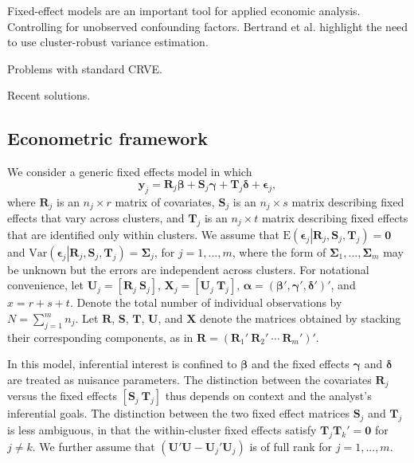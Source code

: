 \documentclass[12pt]{article}\usepackage[]{graphicx}\usepackage[]{color}
\newcommand{\E}{\text{E}}
\newcommand{\Var}{\text{Var}}
\newcommand{\bm}{\mathbf}
\newcommand{\bs}{\boldsymbol}
\begin{document}
Fixed-effect models are an important tool for applied economic analysis. 
Controlling for unobserved confounding factors.
Bertrand et al. highlight the need to use cluster-robust variance estimation.

Problems with standard CRVE.

Recent solutions. 

\subsection{Econometric framework}

We consider a generic fixed effects model in which
\begin{equation}
\label{eq:fixed_effects}
\bm{y}_j = \bm{R}_j \bs\beta + \bm{S}_j \bs\gamma + \bm{T}_j \bs\delta + \bs\epsilon_j,
\end{equation}
where $\bm{R}_j$ is an $n_j \times r$ matrix of covariates, $\bm{S}_j$ is an $n_j \times s$ matrix describing fixed effects that vary across clusters, and $\bm{T}_j$ is an $n_j \times t$ matrix describing fixed effects that are identified only within clusters. 
We assume that $\E\left(\bs\epsilon_j\left|\bm{R}_j,\bm{S}_j, \bm{T}_j\right.\right) = \bm{0}$ and $\Var\left(\bs\epsilon_j\left|\bm{R}_j,\bm{S}_j,\bm{T}_j\right.\right) = \bs\Sigma_j$, for $j = 1,...,m$, where the form of $\bs\Sigma_1,...,\bs\Sigma_m$ may be unknown but the errors are independent across clusters. 
For notational convenience, let $\bm{U}_j = \left[\bm{R}_j \ \bm{S}_j \right]$, $\bm{X}_j = \left[\bm{U}_j \ \bm{T}_j \right]$, $\bs\alpha = \left(\bs\beta', \bs\gamma', \bs\delta' \right)'$, and $x = r + s + t$.
Denote the total number of individual observations by $N = \sum_{j=1}^m n_j$.
Let $\bm{R}$, $\bm{S}$, $\bm{T}$, $\bm{U}$, and $\bm{X}$ denote the matrices obtained by stacking their corresponding components, as in $\bm{R} = \left(\bm{R}_1' \ \bm{R}_2' \ \cdots \ \bm{R}_m'\right)'$. 

In this model, inferential interest is confined to $\bs\beta$ and the fixed effects $\bs\gamma$ and $\bs\delta$ are treated as nuisance parameters. The distinction between the covariates $\bm{R}_j$ versus the fixed effects $\left[\bm{S}_j \ \bm{T}_j\right]$ thus depends on context and the analyst's inferential goals. The distinction between the two fixed effect matrices $\bm{S}_j$ and $\bm{T}_j$ is less ambiguous, in that the within-cluster fixed effects satisfy $\bm{T}_j \bm{T}_k' = \bm{0}$ for $j \neq k$. We further assume that $\left(\bm{U}'\bm{U} - \bm{U}_j'\bm{U}_j\right)$ is of full rank for $j = 1,...,m$.
\end{document}
